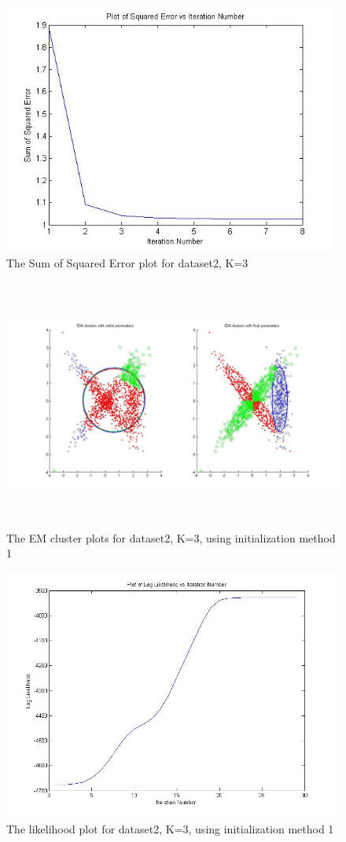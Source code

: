 \documentclass[11pt,psfig]{article}
\begin{document}
\begin{figure}[H]
\centering
\includegraphics[height=3.25in]{dataset2_kMeans_squaredErrorPlot.jpg}
\caption{The Sum of Squared Error plot for dataset2, K=3}
\end{figure}

\begin{figure}[H]
\centering
\includegraphics[height=3.25in]{dataset2_EMclusterPlots.jpg}
\caption{The EM cluster plots for dataset2, K=3, using initialization method 1}
\end{figure}

\begin{figure}[H]
\centering
\includegraphics[height=3.25in]{dataset2_EMlogLikelihoodPlot.jpg}
\caption{The likelihood plot for dataset2, K=3, using initialization method 1}
\end{figure}
\end{document}

